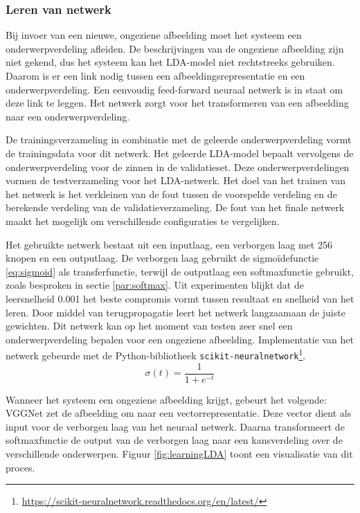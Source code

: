 \subsubsection{Leren van netwerk}
\label{sec:LDAprediction}
Bij invoer van een nieuwe, ongeziene afbeelding moet het systeem een onderwerpverdeling afleiden. De beschrijvingen van de ongeziene afbeelding zijn niet gekend, dus het systeem kan het LDA-model niet rechtstreeks gebruiken. Daarom is er een link nodig tussen een afbeeldingsrepresentatie en een onderwerpverdeling. Een eenvoudig feed-forward neuraal netwerk is in staat om deze link te leggen. 
Het netwerk zorgt voor het transformeren van een afbeelding naar een onderwerpverdeling.

De trainingsverzameling in combinatie met de geleerde onderwerpverdeling vormt de trainingsdata voor dit netwerk. 
Het geleerde LDA-model bepaalt vervolgens de onderwerpverdeling voor de zinnen in de validatieset. Deze onderwerpverdelingen vormen de testverzameling voor het LDA-netwerk. Het doel van het trainen van het netwerk is het verkleinen van de fout tussen de voorspelde verdeling en de berekende verdeling van de validatieverzameling. De fout van het finale netwerk maakt het mogelijk om verschillende configuraties te vergelijken.

Het gebruikte netwerk bestaat uit een inputlaag, een verborgen laag met 256 knopen en een outputlaag. De verborgen laag gebruikt de sigmo\"idefunctie \eqref{eq:sigmoid} als transferfunctie, terwijl de outputlaag een softmaxfunctie gebruikt, zoals besproken in sectie \ref{par:softmax}. Uit experimenten blijkt dat de leersnelheid 0.001 het beste compromis vormt tussen resultaat en snelheid van het leren.
Door middel van terugpropagatie leert het netwerk langzaamaan de juiste gewichten. Dit netwerk kan op het moment van testen zeer snel een onderwerpverdeling bepalen voor een ongeziene afbeelding. Implementatie van het netwerk gebeurde met de Python-bibliotheek \texttt{scikit-neuralnetwork}\footnote{\url{https://scikit-neuralnetwork.readthedocs.org/en/latest/}}.
\begin{equation}
\sigma(t) = \frac{1}{1 + e^{-t}}
\label{eq:sigmoid}
\end{equation}

Wanneer het systeem een ongeziene afbeelding krijgt, gebeurt het volgende: VGGNet zet de afbeelding om naar een vectorrepresentatie. Deze vector dient als input voor de verborgen laag van het neuraal netwerk. Daarna transformeert de softmaxfunctie de output van de verborgen laag naar een kansverdeling over de verschillende onderwerpen. Figuur \ref{fig:learningLDA} toont een visualisatie van dit proces.


